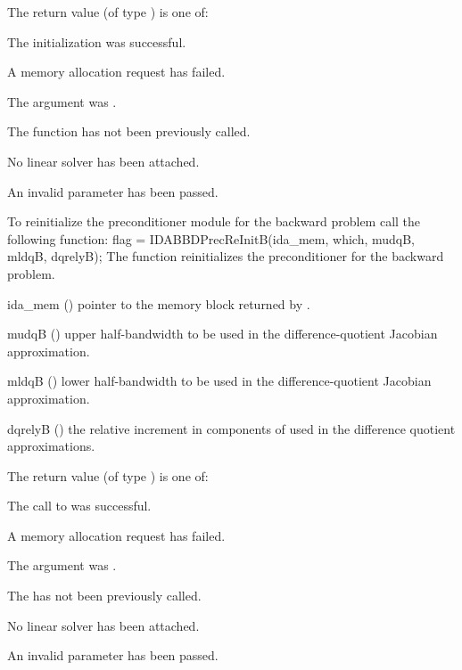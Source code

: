 {
  The return value  (of type ) is one of:
  \begin{args}
  \item[\Id{IDASPILS\_SUCCESS}] 
    The {\idaspgmr} initialization was successful.
  \item[\Id{IDASPILS\_MEM\_FAIL}]
    A memory allocation request has failed.
  \item[\Id{IDASPILS\_MEM\_NULL}]
    The  argument was .
  \item[\Id{IDASPILS\_NO\_ADJ}]
    The function  has not been previously called.
  \item[\Id{IDASPILS\_LMEM\_NULL}]
    No linear solver has been attached.
  \item[\Id{IDASPILS\_ILL\_INPUT}]
    An invalid parameter has been passed.
  \end{args}
}
{}
To reinitialize the {\idabbdpre} preconditioner module for the backward problem
call the following function:
{
  flag = IDABBDPrecReInitB(ida\_mem, which, mudqB, mldqB, dqrelyB);
}
{
  The function  reinitializes the {\idabbdpre} preconditioner
  for the backward problem.
}
{
  \begin{args}
  \item[ida\_mem] ()
    pointer to the {\idas} memory block returned by .
  \item[mudqB] ()
    upper half-bandwidth to be used in the difference-quotient Jacobian approximation.
  \item[mldqB] ()
    lower half-bandwidth to be used in the difference-quotient Jacobian approximation.
  \item[dqrelyB] ()
    the relative increment in components of  used in the difference quotient
    approximations.
  \end{args}
}
{
  The return value  (of type ) is one of:
  \begin{args}
  \item[\Id{IDASPILS\_SUCCESS}]
    The call to  was successful.
  \item[\Id{IDASPILS\_MEM\_FAIL}]
    A memory allocation request has failed.
  \item[\Id{IDASPILS\_MEM\_NULL}]
    The  argument was .
  \item[\Id{IDASPILS\_PMEM\_NULL}]
    The  has not been previously called.
  \item[\Id{IDASPILS\_LMEM\_NULL}]
    No linear solver has been attached.
  \item[\Id{IDASPILS\_ILL\_INPUT}]
    An invalid parameter has been passed.
  \end{args}
}
